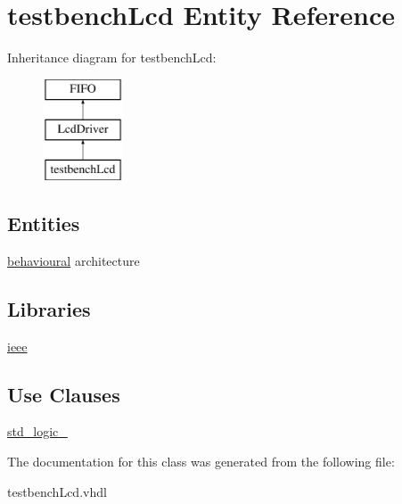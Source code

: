 \hypertarget{classtestbenchLcd}{}\section{testbench\+Lcd Entity Reference}
\label{classtestbenchLcd}
Inheritance diagram for testbench\+Lcd\+:\begin{figure}[H]
\begin{center}
\leavevmode
\includegraphics[height=3.000000cm]{classtestbenchLcd}
\end{center}
\end{figure}
\subsection*{Entities}
\begin{DoxyCompactItemize}
\item 
\hyperlink{classtestbenchLcd_1_1behavioural}{behavioural} architecture
\end{DoxyCompactItemize}
\subsection*{Libraries}
 \begin{DoxyCompactItemize}
\item 
\mbox{\label{classtestbenchLcd_a0a6af6eef40212dbaf130d57ce711256}} 
\hyperlink{classtestbenchLcd_a0a6af6eef40212dbaf130d57ce711256}{ieee} 
\end{DoxyCompactItemize}
\subsection*{Use Clauses}
 \begin{DoxyCompactItemize}
\item 
\mbox{\label{classtestbenchLcd_acd03516902501cd1c7296a98e22c6fcb}} 
\hyperlink{classtestbenchLcd_acd03516902501cd1c7296a98e22c6fcb}{std\+\_\+logic\+\_}   
\end{DoxyCompactItemize}


The documentation for this class was generated from the following file\+:\begin{DoxyCompactItemize}
\item 
testbench\+Lcd.\+vhdl\end{DoxyCompactItemize}
